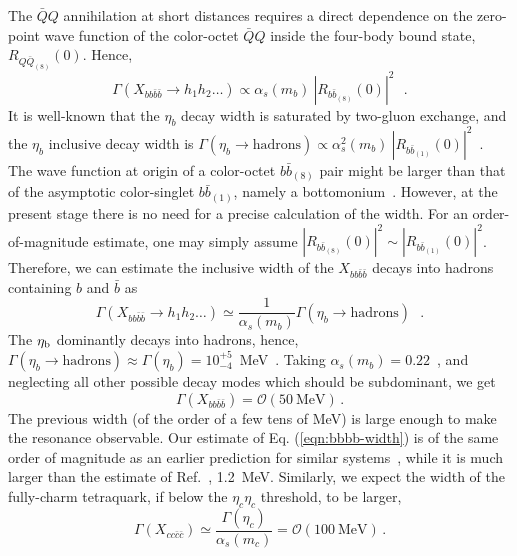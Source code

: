 \documentclass[twocolumn,showpacs,superscriptaddress,preprintnumbers,nofootinbib,prd]{revtex4-1}
\def\be{\begin{equation}}
\def\ee{\end{equation}}
\begin{document}
The $\bar{Q}Q$ annihilation at short distances requires
a direct dependence on the zero-point  wave function of the color-octet $\bar Q Q$
inside the four-body bound state, $R_{Q\bar{Q}_{(8)}}(0)$.
Hence,
\be
\Gamma(X_{bb\bar{b}\bar{b}}\to h_1h_2\ldots) \propto
\alpha_s(m_b)~|R_{b\bar{b}_{(8)}}(0)|^2 \mbox{ }.
\ee
It is well-known that the $\eta_b$ decay width is saturated
by two-gluon exchange, and the $\eta_b$ inclusive decay width is
$\Gamma(\eta_{b} \to \mbox{hadrons}) \propto \alpha_{s}^2(m_b)~
|R_{b\bar{b}_{(1)}}(0)|^2$~\cite{voloshin:1978Rosner:1988}.
The wave function at origin of a color-octet
$b\bar{b}_{(8)}$
pair might be larger than that of the asymptotic color-singlet $b\bar{b}_{(1)}$,
namely a bottomonium~\cite{Isgur:1984bm}.
However, at the present stage there is no need for a precise calculation of the
width. For an order-of-magnitude estimate, one may simply assume
$|R_{b\bar{b}_{(8)}}(0)|^2 \sim |R_{b\bar{b}_{(1)}}(0)|^2$.
Therefore, we can estimate the inclusive width of the $X_{bb\bar{b}\bar{b}}$
decays into hadrons containing $b$ and $\bar b$ as
\be
\Gamma(X_{bb\bar{b}\bar{b}}\to h_1h_2\ldots) \simeq \frac{1}{\alpha_s(m_b)}
\Gamma (\eta_{b} \to \mbox{hadrons}) \mbox{ }.
\ee
The $\eta_{\rm b}$ dominantly decays into hadrons, hence, $\Gamma (\eta_{b}
\to \mbox{hadrons})\approx
\Gamma(\eta_{b})=10^{+5}_{-4}$~MeV~\cite{Nakamura:2010zzi}. Taking
$\alpha_s(m_b)=0.22$~\cite{Nakamura:2010zzi}, and neglecting all other possible
decay modes which should be subdominant, we get
\be
\label{eqn:bbbb-width}
\Gamma(X_{bb\bar{b}\bar{b}}) =\mathcal{O}(50~\textrm{MeV})\, .
\ee
The previous width (of the order of a few tens of MeV) is large enough
to make the resonance observable. Our estimate of Eq. (\ref{eqn:bbbb-width})
is of the same order of magnitude as an earlier prediction for similar systems~\cite{chao:1981},
while it is much larger than the estimate of Ref.~\cite{Karliner:2016zzc}, 1.2~MeV.
Similarly, we expect the width of the fully-charm tetraquark, if below the $\eta_c\eta_c$ threshold, to be larger,
\begin{equation}
  \Gamma(X_{cc\bar c\bar c}) \simeq \frac{\Gamma(\eta_c)}{\alpha_s(m_c)} = \mathcal{O}(100~\textrm{MeV})\,.
\end{equation}
\end{document}
